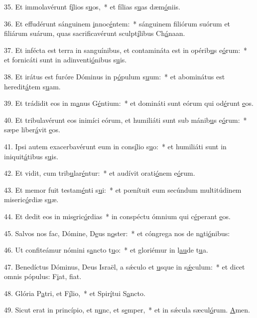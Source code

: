35. Et immolavérunt f\uline{í}lios s\uline{u}os,~* et fílias s\uline{u}as dæm\uline{ó}niis.\par 
36. Et effudérunt sánguinem \uline{i}nnoc\uline{é}ntem:~* sánguinem filiórum suórum et filiárum suárum, quas sacrificavérunt sculpt\uline{í}libus Ch\uline{á}naan.\par 
37. Et infécta est terra in sanguínibus, et contamináta est in opérib\uline{u}s e\uline{ó}rum:~* et fornicáti sunt in adinventi\uline{ó}nibus s\uline{u}is.\par 
38. Et irátus est furóre Dóminus in p\uline{ó}pulum s\uline{u}um:~* et abominátus est heredit\uline{á}tem s\uline{u}am.\par 
39. Et trádidit eos in m\uline{a}nus G\uline{é}ntium:~* et domináti sunt eórum qui od\uline{é}runt \uline{e}os.\par 
40. Et tribulavérunt eos inimíci eórum, et humiliáti sunt sub mánib\uline{u}s e\uline{ó}rum:~* sæpe liber\uline{á}vit \uline{e}os.\par 
41. Ipsi autem exacerbavérunt eum in cons\uline{í}lio s\uline{u}o:~* et humiliáti sunt in iniquit\uline{á}tibus s\uline{u}is.\par 
42. Et vidit, cum trib\uline{u}lar\uline{é}ntur:~* et audívit orati\uline{ó}nem e\uline{ó}rum.\par 
43. Et memor fuit testam\uline{é}nti s\uline{u}i:~* et pœnítuit eum secúndum multitúdinem miseric\uline{ó}rdiæ s\uline{u}æ.\par 
44. Et dedit eos in mis\uline{e}ric\uline{ó}rdias~* in conspéctu ómnium qui c\uline{é}perant \uline{e}os.\par 
45. Salvos nos fac, Dómine, D\uline{e}us n\uline{o}ster:~* et cóngrega nos de n\uline{a}ti\uline{ó}nibus:\par 
46. Ut confiteámur nómini s\uline{a}ncto t\uline{u}o:~* et gloriémur in l\uline{au}de t\uline{u}a.\par 
47. Benedíctus Dóminus, Deus Israël, a sǽculo et \uline{u}sque in s\uline{ǽ}culum:~* et dicet omnis pópulus: F\uline{i}at, f\uline{i}at.\par 
48. Glória P\uline{a}tri, et F\uline{í}lio,~* et Spir\uline{í}tui S\uline{a}ncto.\par 
49. Sicut erat in princípio, et n\uline{u}nc, et s\uline{e}mper,~* et in sǽcula sæcul\uline{ó}rum. \uline{A}men.\par 
